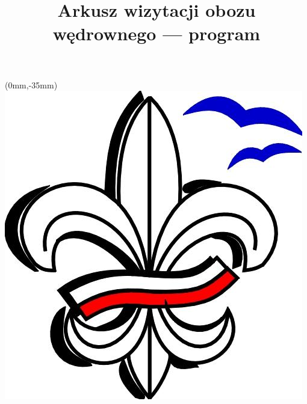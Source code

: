 \documentclass[a4paper,10pt,notitlepage,twoside]{article}
\title{Arkusz wizytacji obozu wędrownego --- program}
\date{} %
\begin{document}
\renewcommand{\headwidth}{18cm} %


\maketitle
\thispagestyle{fancy} %

\begin{textblock*}{20mm}(0mm,-35mm)
\includegraphics[scale=0.15]{lilijka_opom.jpg}
\end{textblock*}
\end{document}
